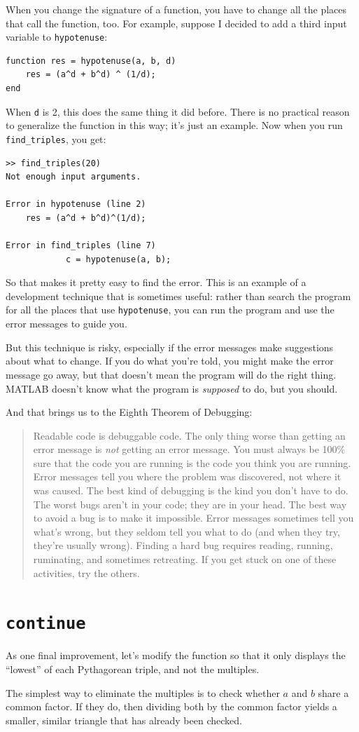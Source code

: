\documentclass{book}
\newcommand{\displaythrm}[1]{%
    \ifthenelse{\equal{#1}{1}}%
        {Readable code is debuggable code.}{%
    \ifthenelse{\equal{#1}{2}}%
        {The only thing worse than getting an error message is {\em
         not} getting an error message.}{%
    \ifthenelse{\equal{#1}{3}}%
        {You must always be 100\% sure that the code you are running
         is the code you think you are running.}{%
    \ifthenelse{\equal{#1}{4}}%
        {Error messages tell you where the problem was discovered,
         not where it was caused.}{%
    \ifthenelse{\equal{#1}{5}}%
        {The best kind of debugging is the kind you don't have to do.}{%
    \ifthenelse{\equal{#1}{6}}%
        {The worst bugs aren't in your code; they are in your head.}{%
    \ifthenelse{\equal{#1}{7}}%
        {The best way to avoid a bug is to make it impossible.}{%
    \ifthenelse{\equal{#1}{8}}%
        {Error messages sometimes tell you what's wrong, but they
         seldom tell you what to do (and when they try, they're usually
         wrong).}{%
    \ifthenelse{\equal{#1}{9}}%
        {Finding a hard bug requires reading, running, ruminating,
         and sometimes retreating.  If you get stuck on one of these
         activities, try the others.}{%
    {}%
}}}}}}}}}}%
\begin{document}
When you change the signature of a function, you have to change all
the places that call the function, too.  For example, suppose
I decided to add a third input variable to {\tt hypotenuse}:

\begin{verbatim}
function res = hypotenuse(a, b, d)
    res = (a^d + b^d) ^ (1/d);
end
\end{verbatim}

When {\tt d} is 2, this does the same thing it did before.  There is
no practical reason to generalize the function in this way; it's just
an example.  Now when you run {\tt find\_triples}, you get:

\begin{verbatim}
>> find_triples(20)
Not enough input arguments.

Error in hypotenuse (line 2)
    res = (a^d + b^d)^(1/d);

Error in find_triples (line 7)
            c = hypotenuse(a, b);
\end{verbatim}

So that makes it pretty easy to find the error.  This is an example of
a development technique that is sometimes useful: rather
than search the program for all the places that use {\tt hypotenuse},
you can run the program and use the error messages to guide you.

But this technique is risky, especially if the error messages make
suggestions about what to change.  If you do what you're told, you
might make the error message go away, but that doesn't mean the
program will do the right thing.  MATLAB doesn't know what the program
is {\em supposed} to do, but you should.

And that brings us to the Eighth Theorem of Debugging:

\begin{quote}
\displaythrm{8}
\end{quote}


\section{{\tt continue}}

As one final improvement, let's modify the function so that it only
displays the ``lowest'' of each Pythagorean triple, and not the
multiples.

The simplest way to eliminate the multiples is to check whether
$a$ and $b$ share a common factor.  If they do, then dividing both
by the common factor yields a smaller, similar triangle that has
already been checked.
\end{document}
